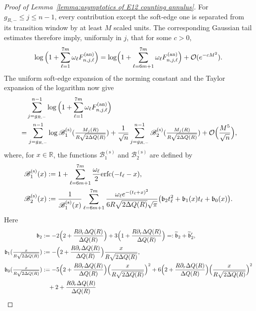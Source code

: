 \documentclass[a4paper]{article}
\newcommand{\erfc}{{\rm erfc}}
\numberwithin{equation}{section}
\begin{document}
\begin{proof}[Proof of Lemma~\ref{lemma:asymptotics of E12 counting annulus}]
For $g_{R,-}\le j\le n-1$, every contribution except the soft-edge one is
separated from its transition window by at least $M$ scaled units.  The
corresponding Gaussian tail estimates therefore imply, uniformly in $j$, that
for some $c>0$,
\[
\log\Big( 
1+\sum_{\ell=1}^{7m}\omega_{\ell}F_{n, j,\ell}^{(\mathrm{an})}
\Bigr)
=
\log\Bigl( 
1+\sum_{\ell=6m+1}^{7m}\omega_{\ell}F_{n,j,\ell}^{(\mathrm{an})}
\Bigr)
+\mathcal{O}(e^{-cM^2}). 
\]
The uniform soft-edge expansion of the norming constant and the Taylor
expansion of the logarithm now give
\begin{align*}
&\quad \sum_{j=g_{R,-}}^{n-1}
\log\Big( 
1+\sum_{\ell=1}^{7m}\omega_{\ell}F_{n, j,\ell}^{(\mathrm{an})}
\Bigr)
\\
&=
\sum_{j=g_{R,-}}^{n-1}\log\mathscr{B}^{(\rm s)}_1(\tfrac{M_j(R)}{R\sqrt{2\Delta Q(R)}})
+\frac{1}{\sqrt{n}}\sum_{j=g_{R,-}}^{n-1}
\mathscr{B}_{2}^{(\rm s)}(\tfrac{M_j(R)}{R\sqrt{2\Delta Q(R)}})
+
\mathcal{O}\Bigl(\frac{M^5}{\sqrt{n}}\Bigr), 
\end{align*}
where, for $x\in\mathbb R$, the functions
$\mathscr B_1^{(\mathrm s)}$ and $\mathscr B_2^{(\mathrm s)}$ are defined by
\begin{align*}
\mathscr{B}_1^{(\rm s)}(x)&:= 
1+\sum_{\ell=6m+1}^{7m}
\frac{\omega_{\ell}}{2}\erfc(-t_{\ell}-x), 
\\
\mathscr{B}_{2}^{(\rm s)}(x)
&:=
\frac{1}{\mathscr{B}_1^{(\rm s)}(x)}
\sum_{\ell=6m+1}^{7m}
\frac{\omega_{\ell}e^{-(t_{\ell}+x)^2}}{6R\sqrt{2\Delta Q(R)}\sqrt{\pi}}
\bigl( 
\mathfrak{b}_2t_{\ell}^2+\mathfrak{b}_1(x)t_{\ell}+\mathfrak{b}_0(x)
\bigr). 
\end{align*}
Here 
\begin{align*}
\mathfrak{b}_2&:=
-2\Bigl(2+\frac{R\partial_r\Delta Q(R)}{\Delta Q(R)}\Bigr)
+
3\Bigl(1+\frac{R\partial_r\Delta Q(R)}{\Delta Q(R)}\Bigr)
=:\widetilde{\mathfrak{b}}_2+\widetilde{\mathfrak{b}}_2',
\\
\mathfrak{b}_1(\tfrac{x}{R\sqrt{2\Delta Q(R)}})&:=
-\Bigl(2+\frac{R\partial_r\Delta Q(R)}{\Delta Q(R)}\Bigr)\frac{x}{R\sqrt{2\Delta Q(R)}}, 
\\
\mathfrak{b}_0(\tfrac{x}{R\sqrt{2\Delta Q(R)}})&:=
-5\Bigl(
2+\frac{R\partial_r\Delta Q(R)}{\Delta Q(R)}
\Bigr)
\Bigl(\frac{x}{R\sqrt{2\Delta Q(R)}}\Bigr)^2
+
6\Bigl(
2+\frac{R\partial_r\Delta Q(R)}{\Delta Q(R)}
\Bigr)
\Bigl(\frac{x}{R\sqrt{2\Delta Q(R)}}\Bigr)^2
\\
&\quad
+2+\frac{R\partial_r\Delta Q(R)}{\Delta Q(R)}

\end{align*}
\end{proof}
\end{document}
